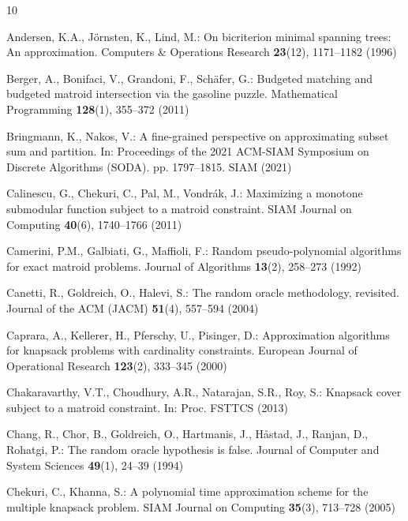 \documentclass[11pt,letter]{article}
\begin{document}
%
		
		\begin{thebibliography}{10}
\providecommand{\url}[1]{\texttt{#1}}
\providecommand{\urlprefix}{URL }
\providecommand{\doi}[1]{https://doi.org/#1}

Andersen, K.A., J{\"o}rnsten, K., Lind, M.: On bicriterion minimal spanning
  trees: An approximation. Computers \& Operations Research  \textbf{23}(12),
  1171--1182 (1996)

Berger, A., Bonifaci, V., Grandoni, F., Sch{\"a}fer, G.: Budgeted matching and
  budgeted matroid intersection via the gasoline puzzle. Mathematical
  Programming  \textbf{128}(1),  355--372 (2011)

Bringmann, K., Nakos, V.: A fine-grained perspective on approximating subset
  sum and partition. In: Proceedings of the 2021 ACM-SIAM Symposium on Discrete
  Algorithms (SODA). pp. 1797--1815. SIAM (2021)

Calinescu, G., Chekuri, C., Pal, M., Vondr{\'a}k, J.: Maximizing a monotone
  submodular function subject to a matroid constraint. SIAM Journal on
  Computing  \textbf{40}(6),  1740--1766 (2011)

Camerini, P.M., Galbiati, G., Maffioli, F.: Random pseudo-polynomial algorithms
  for exact matroid problems. Journal of Algorithms  \textbf{13}(2),  258--273
  (1992)

Canetti, R., Goldreich, O., Halevi, S.: The random oracle methodology,
  revisited. Journal of the ACM (JACM)  \textbf{51}(4),  557--594 (2004)

Caprara, A., Kellerer, H., Pferschy, U., Pisinger, D.: Approximation algorithms
  for knapsack problems with cardinality constraints. European Journal of
  Operational Research  \textbf{123}(2),  333--345 (2000)

Chakaravarthy, V.T., Choudhury, A.R., Natarajan, S.R., Roy, S.: Knapsack cover
  subject to a matroid constraint. In: Proc. FSTTCS (2013)

Chang, R., Chor, B., Goldreich, O., Hartmanis, J., H{\aa}stad, J., Ranjan, D.,
  Rohatgi, P.: The random oracle hypothesis is false. Journal of Computer and
  System Sciences  \textbf{49}(1),  24--39 (1994)

Chekuri, C., Khanna, S.: A polynomial time approximation scheme for the
  multiple knapsack problem. SIAM Journal on Computing  \textbf{35}(3),
  713--728 (2005)


\end{thebibliography}
\end{document}
